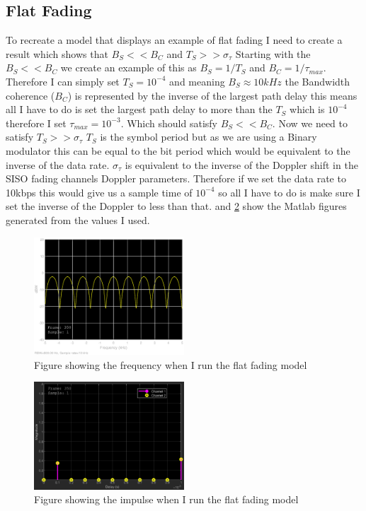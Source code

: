 \documentclass[a4paper,12pt]{scrartcl}
\begin{document}
{{		\subsection{Flat Fading}
		{
			To recreate a model that displays an example of flat fading I need to create a result which shows that $B_S << B_C$ and $T_S >> \sigma_\tau$ Starting with the $B_S << B_C$ we create an example of this as $B_S = 1/T_S$ and $B_C = 1/\tau_{max}$. Therefore I can simply set $T_S = 10^{-4}$ and meaning $B_S \approx 10kHz$ the Bandwidth coherence ($B_C$) is represented by the inverse of the largest path delay this means all I have to do is set the largest path delay to more than the $T_S$ which is $10^{-4}$ therefore I set $\tau_{max} = 10^{-3}$. Which should satisfy $B_S << B_C$. Now we need to satisfy $T_S >> \sigma_\tau$ $T_S$ is the symbol period but as we are using a Binary modulator this can be equal to the bit period which would be equivalent to the inverse of the data rate. $\sigma_\tau$ is equivalent to the inverse of the Doppler shift in the SISO fading channels Doppler parameters. Therefore if we set the data rate to 10kbps this would give us a sample time of $10^{-4}$ so all I have to do is make sure I set the inverse of the Doppler to less than that.  and \cref{fig:FlatFadingImplResp} show the Matlab figures generated from the values I used.
			\begin{figure}
				\centering
				\includegraphics[width=0.5\textwidth]{FlatFadingFrequencyResponse}
				\caption{Figure showing the frequency when I run the flat fading model}
				\label{fig:FlatFadingFreqResp}
			\end{figure}
			\begin{figure}
				\centering
				\includegraphics[width=0.5\textwidth]{FlatFadingImpulseResponse}
				\caption{Figure showing the impulse when I run the flat fading model}
				\label{fig:FlatFadingImplResp}
			\end{figure}
		}
}}
\end{document}
